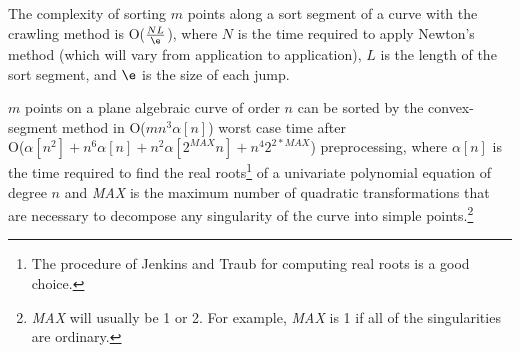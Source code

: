 The complexity of sorting $m$ points along a sort segment
of a curve with the crawling method is O($\frac{NL}{\e}$), where $N$ 
is the time required to apply Newton's method
(which will vary from application to application), $L$ is the length
of the sort segment, and $\e$ is the size of each jump.
%
\begin{theorem}
$m$ points on a plane algebraic curve of order $n$
can be sorted by the convex-segment
method in O($mn^{3}\alpha[n]$) worst case time after \\
O($\alpha[n^{2}] + n^6\alpha[n] + n^{2}\alpha[2^{MAX}n] + 
n^{4}2^{2*MAX}$) preprocessing,
where $\alpha[n]$ is the time
required to find the real roots\footnote{The
procedure of Jenkins and Traub \cite{jen} for computing real roots
is a good choice.}
of a univariate polynomial equation of degree $n$
and {\em MAX} is the maximum number of quadratic transformations that are 
necessary to decompose any singularity of the curve into simple 
points.\footnote{{\em MAX} will usually be 1 or 2.  For
example, {\em MAX} is 1 if all of the singularities are ordinary.}
\end{theorem}
